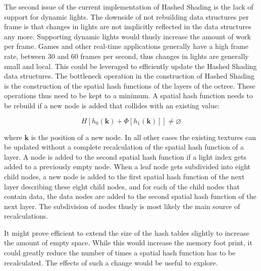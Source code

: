 The second issue of the current implementation of Hashed Shading is the lack of support for
dynamic lights. The downside of not rebuilding data structures per frame is that changes
in lights are not implicitly reflected in the data structures any more. Supporting dynamic
lights would thusly increase the amount of work per frame.
Games and other real-time applications generally have a high frame rate, between 30 and 60 frames
per second, thus changes in lights are generally small and local. This could be leveraged
to efficiently update the Hashed Shading data structures.
The bottleneck operation in the construction of Hashed Shading is the construction of the
spatial hash functions of the layers of the octree. These operations thus need to be kept
to a minimum. A spatial hash function needs to be rebuild if a new node is added that collides
with an existing value:

\begin{equation*}
    H\left[ \mathit{h}_0\left(\mathbf{k}\right) + \Phi\left[ \mathit{h}_1\left(\mathbf{k}\right) \right] \right] \neq \varnothing 
\end{equation*}

\noindent where $\mathbf{k}$ is the position of a new node. In all other cases the existing
textures can be updated without a complete recalculation of the spatial hash function of a layer.
A node is added to the second spatial hash function if a light index gets added to a previously empty
node. When a leaf node gets subdivided into eight child nodes, a new node is added to the first
spatial hash function of the next layer describing these eight child nodes, and for each of the child
nodes that contain data, the data nodes are added to the second spatial hash function of the next layer.
The subdivision of nodes thusly is most likely the main source of recalculations.

It might prove efficient to extend the size of the hash tables slightly to increase the amount
of empty space. While this would increase the memory foot print, it could greatly reduce the
number of times a spatial hash function has to be recalculated. The effects of such a change
would be useful to explore.

